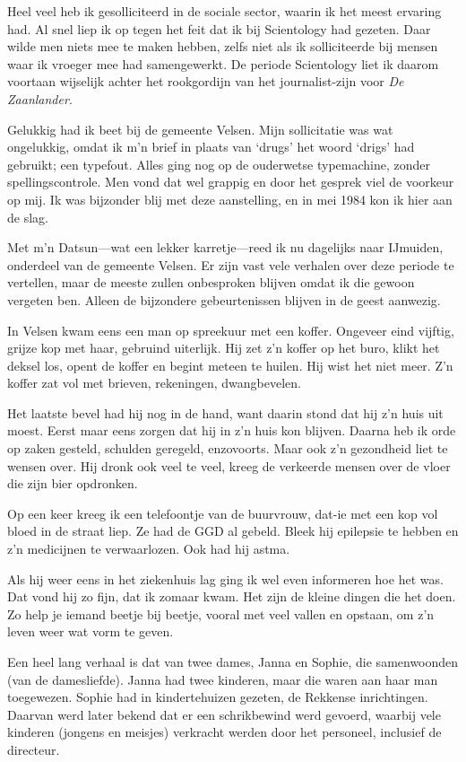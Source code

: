 \documentclass[12pt,twoside, openright]{memoir}
\begin{document}
Heel veel heb ik gesolliciteerd in de sociale sector, waarin ik het meest ervaring had. Al snel liep ik op tegen het feit dat ik bij Scientology had gezeten. Daar wilde men niets mee te maken hebben, zelfs niet als ik solliciteerde bij mensen waar ik vroeger mee had samengewerkt. De periode Scientology liet ik daarom voortaan wijselijk achter het rookgordijn van het journalist-zijn voor \emph{De Zaanlander}.

Gelukkig had ik beet bij de gemeente Velsen. Mijn sollicitatie was wat ongelukkig, omdat ik m’n brief in plaats van `drugs' het woord `drigs' had gebruikt; een typefout. Alles ging nog op de ouderwetse typemachine, zonder spellingscontrole. Men vond dat wel grappig en door het gesprek viel de voorkeur op mij. Ik was bijzonder blij met deze aanstelling, en in mei 1984 kon ik hier aan de slag.

Met m’n Datsun---wat een lekker karretje---reed ik nu dagelijks naar IJmuiden, onderdeel van de gemeente Velsen. Er zijn vast vele verhalen over deze periode te vertellen, maar de meeste zullen onbesproken blijven omdat ik die gewoon vergeten ben. Alleen de bijzondere gebeurtenissen blijven in de geest aanwezig.

In Velsen kwam eens een man op spreekuur met een koffer. Ongeveer eind vijftig, grijze kop met haar, gebruind uiterlijk. Hij zet z’n koffer op het buro, klikt het deksel los, opent de koffer en begint meteen te huilen. Hij wist het niet meer. Z’n koffer zat vol met brieven, rekeningen, dwangbevelen. 

Het laatste bevel had hij nog in de hand, want daarin stond dat hij z’n huis uit moest. Eerst maar eens zorgen dat hij in z’n huis kon blijven. Daarna heb ik orde op zaken gesteld, schulden geregeld, enzovoorts. Maar ook z’n gezondheid liet te wensen over. Hij dronk ook veel te veel, kreeg de verkeerde mensen over de vloer die zijn bier opdronken. 

Op een keer kreeg ik een telefoontje van de buurvrouw, dat-ie met een kop vol bloed in de straat liep. Ze had de GGD al gebeld. Bleek hij epilepsie te hebben en z’n medicijnen te verwaarlozen. Ook had hij astma. 

Als hij weer eens in het ziekenhuis lag ging ik wel even informeren hoe het was. Dat vond hij zo fijn, dat ik zomaar kwam. Het zijn de kleine dingen die het doen. Zo help je iemand beetje bij beetje, vooral met veel vallen en opstaan, om z’n leven weer wat vorm te geven.

Een heel lang verhaal is dat van twee dames, Janna en Sophie, die samenwoonden (van de damesliefde). Janna had twee kinderen, maar die waren aan haar man toegewezen. Sophie had in kindertehuizen gezeten, de Rekkense inrichtingen. Daarvan werd later bekend dat er een schrikbewind werd gevoerd, waarbij vele kinderen (jongens en meisjes) verkracht werden door het personeel, inclusief de directeur. 
\end{document}
